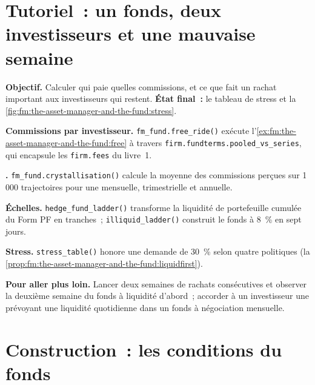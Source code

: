 \section{Tutoriel~: un fonds, deux investisseurs et une mauvaise semaine}\label{tut:fm:the-asset-manager-and-the-fund:tut}

\begin{tutorial}
\textbf{Objectif.} Calculer qui paie quelles commissions, et ce que fait un rachat important aux investisseurs qui restent. \textbf{État final~:} le tableau de stress et
la \cref{fig:fm:the-asset-manager-and-the-fund:stress}.
\begin{tutsteps}
\item \textbf{Commissions par investisseur.} \texttt{fm\_fund.free\_ride()} exécute l'\cref{ex:fm:the-asset-manager-and-the-fund:free} à travers
\texttt{firm.fundterms.pooled\_vs\_series}, qui encapsule les \texttt{firm.fees} du livre~1.
\item \textbf{.} \texttt{fm\_fund.crystallisation()} calcule la moyenne des commissions perçues sur 1\,000 trajectoires pour une
 mensuelle, trimestrielle et annuelle.
\item \textbf{Échelles.} \texttt{hedge\_fund\_ladder()} transforme la liquidité de portefeuille cumulée du Form PF en tranches~; \texttt{illiquid\_ladder()}
construit le fonds à 8~\% en sept jours.
\item \textbf{Stress.} \texttt{stress\_table()} honore une demande de 30~\% selon quatre politiques (la \cref{prop:fm:the-asset-manager-and-the-fund:liquidfirst}).
\end{tutsteps}
\end{tutorial}

\textbf{Pour aller plus loin.} Lancer deux semaines de rachats consécutives et observer la deuxième semaine du fonds à liquidité d'abord~; accorder à un investisseur une
 prévoyant une liquidité quotidienne dans un fonds à négociation mensuelle.

\section{Construction~: les conditions du fonds}\label{bld:fm:the-asset-manager-and-the-fund:fundterms}

